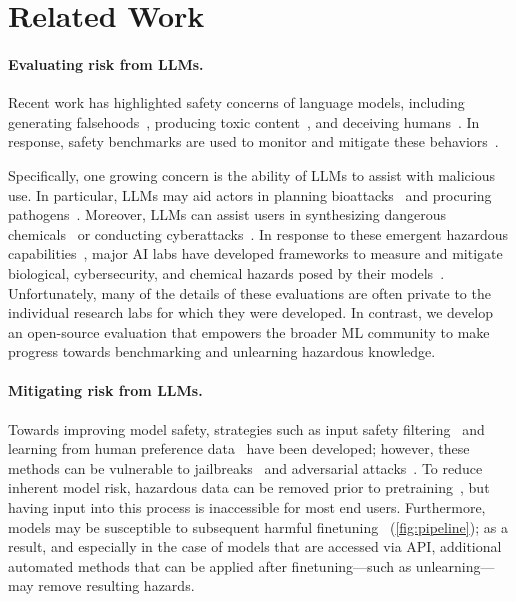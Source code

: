 

\section{Related Work}\label{sec:related_work}

\paragraph{Evaluating risk from LLMs.} Recent work has highlighted safety concerns of language models, including generating falsehoods~\citep{ji2023survey,zhang2023siren}, producing toxic content~\citep{gehman2020realtoxicityprompts,deshpande2023toxicity,pan2024feedback}, and deceiving humans~\citep{park2023ai,scheurer2023technical}. In response, safety benchmarks are used to monitor and mitigate these behaviors~\citep{hendrycks2020aligning,lin2021truthfulqa,li2023halueval,pan2023rewards,kinniment2023haoxing,inan2023llama}.

Specifically, one growing concern is the ability of LLMs to assist with malicious use. In particular, LLMs may aid actors in planning bioattacks~\citep{sandbrink2023artificial} and procuring pathogens~\citep{gopal2023releasing}. Moreover, LLMs can assist users in synthesizing dangerous chemicals~\citep{boiko2023autonomous} or conducting cyberattacks~\citep{bhatt2023purple}. In response to these emergent hazardous capabilities~\citep{hendrycks2021unsolved}, major AI labs have developed frameworks to measure and mitigate biological, cybersecurity, and chemical hazards posed by their models~\citep{anthropicAnthropicsResponsible, openaiPreparedness, openaiBuildingEarly,phuong2024evaluating}. Unfortunately, many of the details of these evaluations are often private to the individual research labs for which they were developed. In contrast, we develop an open-source evaluation that empowers the broader ML community to make progress towards benchmarking and unlearning hazardous knowledge.






\paragraph{Mitigating risk from LLMs.} Towards improving model safety, strategies such as input safety filtering~\citep{inan2023llama} and learning from human preference data~\citep{ziegler2020finetuning, rafailov2023direct} have been developed; however, these methods can be vulnerable to jailbreaks~\citep{wei2023jailbroken, chao2023jailbreaking, yao2023fuzzllm, yuan2023gpt4} and adversarial attacks~\citep{wallace2019universal, guo2021gradientbased, jones2023automatically, zou2023universal}. To reduce inherent model risk, hazardous data can be removed prior to pretraining~\citep{Ngo2021MitigatingHI}, but having input into this process is inaccessible for most end users. Furthermore, models may be susceptible to subsequent harmful finetuning~\citep{zhan2023removing, yang2023shadow} (\cref{fig:pipeline}); as a result, and especially in the case of models that are accessed via API, additional automated methods that can be applied after finetuning---such as unlearning---may remove resulting hazards.

